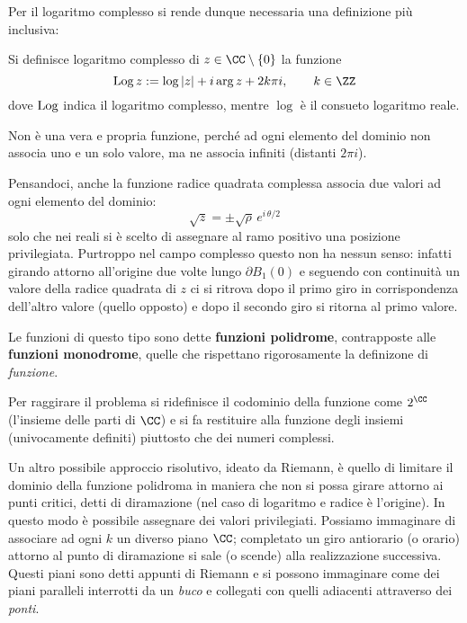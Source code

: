 Per il logaritmo complesso si rende dunque necessaria una definizione più inclusiva:
\begin{defn}
Si definisce logaritmo complesso di $z\in\CC\setminus\{0\}$ la funzione
\begin{equation*}
\Log z:=\log|z|+i\arg z+2k\pi i,\qquad  k\in \ZZ
\end{equation*}
dove $\operatorname{Log}$ indica il logaritmo complesso, mentre $\log$ è il consueto logaritmo reale.
\end{defn}
Non è una vera e propria funzione, perché ad ogni elemento del dominio non associa uno e un solo valore, ma ne associa infiniti (distanti $2\pi i$).

Pensandoci, anche la funzione radice quadrata complessa associa due valori ad ogni elemento del dominio:
$$
\sqrt{z}=\pm\sqrt{\rho}\,e^{i\,\theta/2}
$$
solo che nei reali si è scelto di assegnare al ramo positivo una posizione privilegiata. Purtroppo nel campo complesso questo non ha nessun senso: infatti girando attorno all'origine due volte lungo $\partial B_1(0)$ e seguendo con continuità un valore della radice quadrata di $z$ ci si ritrova dopo il primo giro in corrispondenza dell'altro valore (quello opposto) e dopo il secondo giro si ritorna al primo valore.

Le funzioni di questo tipo sono dette \textbf{funzioni polidrome}, contrapposte alle \textbf{funzioni monodrome}, quelle che rispettano rigorosamente la definizone di \textit{funzione}. 

Per raggirare il problema si ridefinisce il codominio della funzione come $2^\CC$ (l'insieme delle parti di $\CC$) e si fa restituire alla funzione degli insiemi (univocamente definiti) piuttosto che dei numeri complessi. 

Un altro possibile approccio risolutivo, ideato da Riemann, è quello di limitare il dominio della funzione polidroma in maniera che non si possa girare attorno ai punti critici, detti di diramazione (nel caso di logaritmo e radice è l'origine). In questo modo è possibile assegnare dei valori privilegiati. Possiamo immaginare di associare ad ogni $k$ un diverso piano $\CC$; completato un giro antiorario (o orario) attorno al punto di diramazione si sale (o scende) alla realizzazione successiva. Questi piani sono detti appunti di Riemann e si possono immaginare come dei piani paralleli interrotti da un \textit{buco} e collegati con quelli adiacenti attraverso dei \textit{ponti}.



